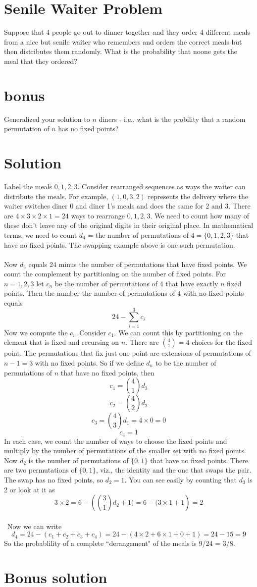 \documentclass[11pt,a4paper]{report}
\theoremstyle{plain}
\theoremstyle{definition}
\theoremstyle{remark}
\begin{document}
\section*{Senile Waiter Problem}
Suppose that 4 people go out to dinner together and they order 4 different meals from a nice but senile waiter who remembers and orders the correct meals but then distributes them randomly.  What is the probability that noone gets the meal that they ordered?

\section*{bonus}
Generalized your solution to $n$ diners - i.e., what is the probility that a random permutation of $n$ has no fixed points?

\newpage
\section*{Solution}
Label the meals $0,1,2,3$.  Consider rearranged sequences as ways the waiter can distribute the meals.  For example, $(1,0,3,2)$ represents the delivery where the waiter switches diner 0 and diner 1's meals and does the same for 2 and 3.  There are $4\times3\times2\times1= 24$ ways to rearrange $0,1,2,3$.  We need to count how many of these don't leave any of the original digits in their original place.  In mathematical terms, we need to count $d_4$ = the number of permutations of $4 = \{0, 1, 2, 3\}$ that have no fixed points.  The swapping example above is one such permutation. 
\\\\
Now $d_4$ equals  24 minus the number of permutations that have fixed points. We count the complement by partitioning on the number of fixed points.  For $n = 1, 2, 3$ let $c_n$ be the number of permutations of 4 that have exactly $n$ fixed points.  Then the number the number of permutations of $4$ with no fixed points equals $$ 24 - \sum_{i=1}^{3}{c_i}$$
Now we compute the $c_i$.  Consider $c_{1}$.  We can count this by partitioning on the element that is fixed and recursing on $n$.  There are $ \binom{4}{1} = 4$ choices for the fixed point.  The permutations that fix just one point are extensions of permutations of $n - 1 = 3$ with no fixed points.  So if we define $d_n$ to be the number of permutations of $n$ that have no fixed points, then 
$$c_{1} =  \binom{4}{1} d_{3}$$
$$c_{2} = \binom{4}{2} d_{2}$$
$$c_{3} = \binom{4}{3} d_{1} = 4 \times 0 = 0$$
$$c_{4} = 1$$
In each case, we count the number of ways to choose the fixed points and multiply by the number of permutations of the smaller set with no fixed points.  Now $d_{2}$ is the number of permutations of $\{0,1\}$ that have no fixed points.  There are two permutations of  $\{0,1\}$, viz., the identity and the one that swaps the pair.  The swap has no fixed points, so $d_{2} = 1$.  You can see easily by counting that $d_{3}$ is 2 or look at it as $$3\times2 =6 - ({\binom{3}{1} d_{2}+ 1) =  6 -({3} \times{1}+ 1} ) = 2$$
\\\
Now we can write $$d_4 = 24 - (c_1 + c_2 + c_3 + c_4) = 24 - (4 \times 2 + 6 \times 1 + 0 +  1) = 24 - 15 = 9$$
So the probablility of a complete ``derangement" of the meals is 9/24 = 3/8.

\section*{Bonus solution}
\end{document}
